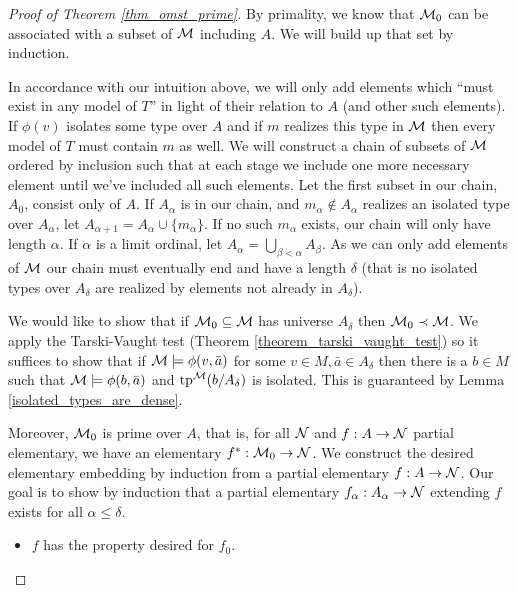 \begin{proof}[Proof of Theorem \ref{thm_omst_prime}]\label{proof_omst_prime} 
By primality, we know that \(\mathcal{M}_0\) can be associated with a subset of \(\mathcal{M}\) including \(A\). 
We will build up that set by induction. 

In accordance with our intuition above, we will only add elements which ``must exist in any model of \(T\)'' in light of their relation to \(A\) (and other such elements).
If \(\phi(v)\) isolates some type over \(A\) and if \(m\) realizes this type in \(\mathcal{M}\) then every model of \(T\) must contain \(m\) as well. 
We will construct a chain of subsets of \(\mathcal{M}\) ordered by inclusion such that at each stage we include one more necessary element until we've included all such elements. 
Let the first subset in our chain, \(A_0\), consist only of \(A\). 
If \(A_\alpha\) is in our chain, and \(m_\alpha \notin A_\alpha\) realizes an isolated type over \(A_\alpha\), let \(A_{\alpha+1} = A_\alpha \cup \{m_\alpha\}\).
If no such \(m_\alpha\) exists, our chain will only have length \(\alpha\). 
If \(\alpha\) is a limit ordinal, let \(A_\alpha = \bigcup\limits_{\beta < \alpha} A_\beta\). 
As we can only add elements of \(\mathcal{M}\) our chain must eventually end and have a length \(\delta\) (that is no isolated types over \(A_\delta\) are realized by elements not already in \(A_\delta\)).

We would like to show that if \(\mathcal{M}_0 \subseteq \mathcal{M}\) has universe \(A_\delta\) then \(\mathcal{M}_0 \prec \mathcal{M}\).
We apply the Tarski-Vaught test (Theorem \ref{theorem_tarski_vaught_test}) so it suffices to show that if \(\mathcal{M} \models \phi(v, \bar{a})\) for some \(v \in M, \bar{a} \in A_\delta\) then there is a \(b \in M\) such that \(\mathcal{M} \models \phi(b, \bar{a})\) and \(\text{tp}^{\mathcal{M}}(b/A_\delta)\) is isolated. 
This is guaranteed by Lemma \ref{isolated_types_are_dense}.

Moreover, \(\mathcal{M}_0\) is prime over \(A\), that is, for all \(\mathcal{N}\) and \(f: A \to \mathcal{N}\) partial elementary, we have an elementary \(f^*: \mathcal{M}_0 \to \mathcal{N}\). 
We construct the desired elementary embedding by induction from a partial elementary \(f: A \to \mathcal{N}\).  
Our goal is to show by induction that a partial elementary \(f_\alpha:A_\alpha \to \mathcal{N}\) extending \(f\) exists for all \(\alpha \leq \delta\). 

\begin{itemize}
\item \(f\) has the property desired for \(f_0\). 


\end{itemize}
\end{proof}
